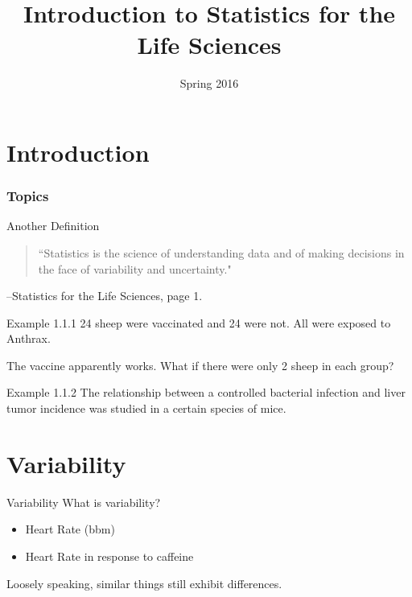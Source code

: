 \documentclass{beamer}
\title[STAT 371]{Introduction to Statistics for the Life Sciences}
\date{Spring 2016}
\begin{document}
\section{Introduction}

\begin{frame}
\titlepage
\end{frame}

\begin{frame}
\frametitle{Topics} 
\tableofcontents
\end{frame}

\begin{frame}{Another Definition}
\begin{quote}
``Statistics is the science of understanding data and of making decisions in the face of variability and uncertainty."
\end{quote}
--Statistics for the Life Sciences, page 1.
\end{frame}


\begin{frame}{Example 1.1.1}
24 sheep were vaccinated and 24 were not. All were exposed to Anthrax. 

\pause
The vaccine apparently works. What if there were only 2 sheep in each group?
\end{frame}

\begin{frame}{Example 1.1.2}
The relationship between a controlled bacterial infection and liver tumor incidence was studied in a certain species of mice. 

\end{frame}

\section{Variability}
\begin{frame}{Variability}
What is variability?
\pause
\begin{itemize}
  \item Heart Rate (bbm)
  \pause
  \item Heart Rate in response to caffeine
\end{itemize}
Loosely speaking, similar things still exhibit differences.
\end{frame}
\end{document}
